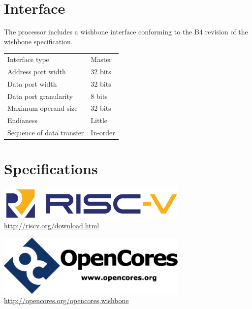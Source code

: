 \documentclass[10pt,a4paper]{article}
\begin{document}
\begin{minipage}[t]{0.48\textwidth}
\section{Interface}

The processor includes a wishbone interface conforming to the B4 revision of the
wishbone specification.\\

\begin{tabularx}{\textwidth}{|l|X|}
\hline
Interface type & Master \\
Address port width & 32 bits \\
Data port width & 32 bits \\
Data port granularity & 8 bits \\
Maximum operand size & 32 bits \\
Endianess & Little \\
Sequence of data transfer & In-order \\
\hline
\end{tabularx}

\section{Specifications}

\center\includegraphics[width=0.7\textwidth]{riscv.png}
\url{http://riscv.org/download.html}

\center\includegraphics[width=0.7\textwidth]{opencores.png}
\url{http://opencores.org/opencores,wishbone}

\end{minipage}\hfill
\end{document}
